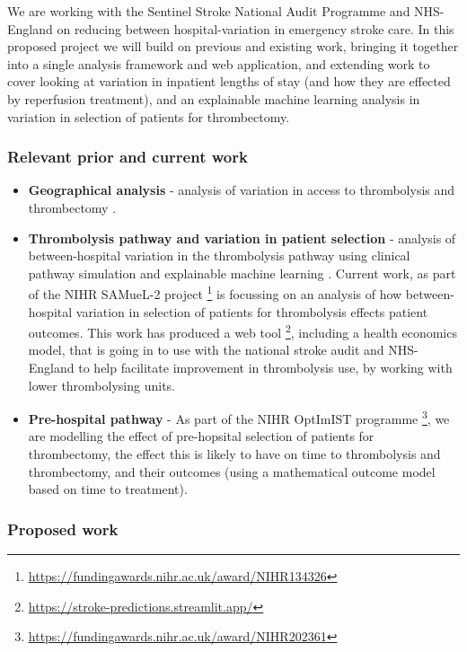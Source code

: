 We are working with the Sentinel Stroke National Audit Programme and NHS-England on reducing between hospital-variation in emergency stroke care. In this proposed project we will build on previous and existing work, bringing it together into a single analysis framework and web application, and extending work to cover looking at variation in inpatient lengths of stay (and how they are effected by reperfusion treatment), and an explainable machine learning analysis in variation in selection of patients for thrombectomy.

\subsubsection{Relevant prior and current work}

\begin{itemize}
    \item \textbf{Geographical analysis} - analysis of variation in access to thrombolysis and thrombectomy \cite{allen_maximising_2019}.

    \item \textbf{Thrombolysis pathway and variation in patient selection} - analysis of between-hospital variation in the thrombolysis pathway using clinical pathway simulation and explainable machine learning \cite{allen_use_2022, pearn_what_2023}. Current work, as part of the NIHR SAMueL-2 project \footnote{\url{https://fundingawards.nihr.ac.uk/award/NIHR134326}} is focussing on an analysis of how between-hospital variation in selection of patients for thrombolysis effects patient outcomes. This work has produced a web tool \footnote{\url{https://stroke-predictions.streamlit.app/}}, including a health economics model, that is going in to use with the national stroke audit and NHS-England to help facilitate improvement in thrombolysis use, by working with lower thrombolysing units.

    \item \textbf{Pre-hospital pathway} - As part of the NIHR OptImIST programme \footnote{\url{https://fundingawards.nihr.ac.uk/award/NIHR202361}}, we are modelling the effect of pre-hopsital selection of patients for thrombectomy, the effect this is likely to have on time to thrombolysis and thrombectomy, and their outcomes (using a mathematical outcome model based on time to treatment).
    
\end{itemize}

\subsubsection{Proposed work}

